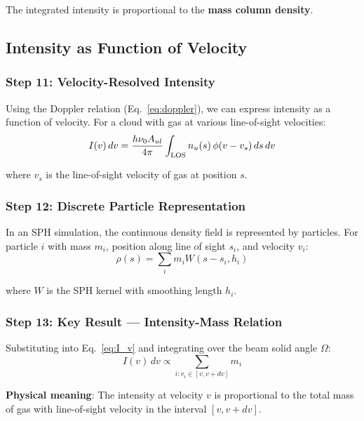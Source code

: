 \documentclass[twocolumn,amsmath,amssymb,prd,superscriptaddress,nofootinbib]{revtex4-2}
\begin{document}
The integrated intensity is proportional to the \textbf{mass column density}.

\subsection{Intensity as Function of Velocity}

\subsubsection{Step 11: Velocity-Resolved Intensity}

Using the Doppler relation (Eq.~\ref{eq:doppler}), we can express intensity as a function of velocity. For a cloud with gas at various line-of-sight velocities:
\begin{equation}
    I(v) \, dv = \frac{h\nu_0 A_{ul}}{4\pi} \int_{\rm LOS} n_u(s) \, \phi(v - v_s) \, ds \, dv
    \label{eq:I_v}
\end{equation}

where $v_s$ is the line-of-sight velocity of gas at position $s$.

\subsubsection{Step 12: Discrete Particle Representation}

In an SPH simulation, the continuous density field is represented by particles. For particle $i$ with mass $m_i$, position along line of sight $s_i$, and velocity $v_i$:
\begin{equation}
    \rho(s) = \sum_i m_i W(s - s_i, h_i)
\end{equation}

where $W$ is the SPH kernel with smoothing length $h_i$.

\subsubsection{Step 13: Key Result --- Intensity-Mass Relation}

Substituting into Eq.~\eqref{eq:I_v} and integrating over the beam solid angle $\Omega$:
\begin{equation}
    \boxed{I(v) \, dv \propto \sum_{i: v_i \in [v, v+dv]} m_i}
    \label{eq:I_mass}
\end{equation}

\textbf{Physical meaning}: The intensity at velocity $v$ is proportional to the total mass of gas with line-of-sight velocity in the interval $[v, v+dv]$.
\end{document}
